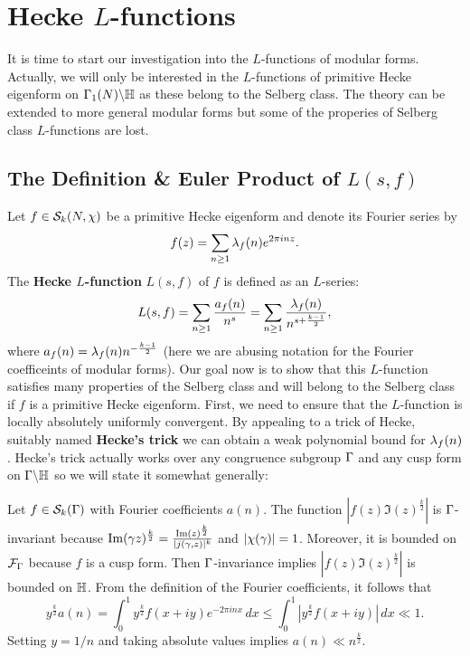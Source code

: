   \section{Hecke \texorpdfstring{$L$}{L}-functions}
    It is time to start our investigation into the $L$-functions of modular forms. Actually, we will only be interested in the $L$-functions of primitive Hecke eigenform on $\Gamma_{1}(N)\backslash\mathbb{H}$ as these belong to the Selberg class. The theory can be extended to more general modular forms but some of the properies of Selberg class $L$-functions are lost.
    \subsection*{The Definition \& Euler Product of \texorpdfstring{$L(s,f)$}{L(s,f)}}
      Let $f \in \mathcal{S}_{k}(N,\chi)$ be a primitive Hecke eigenform and denote its Fourier series by
      \[
        f(z) = \sum_{n \ge 1}\lambda_{f}(n)e^{2\pi inz}.
      \]
      The \textbf{Hecke $L$-function} $L(s,f)$ of $f$ is defined as an $L$-series:
      \[
        L(s,f) = \sum_{n \ge 1}\frac{a_{f}(n)}{n^{s}} = \sum_{n \ge 1}\frac{\lambda_{f}(n)}{n^{s+\frac{k-1}{2}}},
      \]
      where $a_{f}(n) = \lambda_{f}(n)n^{-\frac{k-1}{2}}$ (here we are abusing notation for the Fourier coefficeints of modular forms). Our goal now is to show that this $L$-function satisfies many properties of the Selberg class and will belong to the Selberg class if $f$ is a primitive Hecke eigenform. First, we need to ensure that the $L$-function is locally absolutely uniformly convergent. By appealing to a trick of Hecke, suitably named \textbf{Hecke's trick} we can obtain a weak polynomial bound for $\lambda_{f}(n)$. Hecke's trick actually works over any congruence subgroup $\Gamma$ and any cusp form on $\Gamma\backslash\mathbb{H}$ so we will state it somewhat generally:

      \begin{method}
        Let $f \in \mathcal{S}_{k}(\Gamma)$ with Fourier coefficients $a(n)$. The function $\left|f(z)\Im(z)^{\frac{k}{2}}\right|$ is $\Gamma$-invariant because $\mathrm{Im}(\gamma z)^{\frac{k}{2}} = \frac{\mathrm{Im}(z)^{\frac{k}{2}}}{|j(\gamma,z)|^{k}}$ and $|\chi(\gamma)| = 1$. Moreover, it is bounded on $\mathcal{F}_{\Gamma}$ because $f$ is a cusp form. Then $\Gamma$-invariance implies $\left|f(z)\Im(z)^{\frac{k}{2}}\right|$ is bounded on $\mathbb{H}$. From the definition of the Fourier coefficients, it follows that
        \[
          y^{\frac{k}{2}}a(n) = \int_{0}^{1}y^{\frac{k}{2}}f(x+iy)e^{-2\pi inx}\,dx \le \int_{0}^{1}\left|y^{\frac{k}{2}}f(x+iy)\right|\,dx \ll 1.
        \]
        Setting $y = 1/n$ and taking absolute values implies $a(n) \ll n^{\frac{k}{2}}$.
      \end{method}

